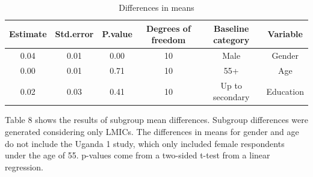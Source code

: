 \documentclass[
  12pt,
]{article}
\begin{document}
\begin{table}[!h]

\caption{\label{tab:dmeans}Differences in means}
\centering
\fontsize{10}{12}\selectfont
\begin{threeparttable}
\begin{tabular}[t]{cccccc}
\toprule
\textbf{Estimate} & \textbf{Std.error} & \textbf{P.value} & \textbf{Degrees of freedom} & \textbf{Baseline category} & \textbf{Variable}\\
\midrule
0.04 & 0.01 & 0.00 & 10 & Male & Gender\\
0.00 & 0.01 & 0.71 & 10 & 55+ & Age\\
0.02 & 0.03 & 0.41 & 10 & Up to secondary & Education\\
\bottomrule
\end{tabular}
\begin{tablenotes}
\item Table 8 shows the results of subgroup mean differences. Subgroup differences were generated considering only LMICs. The differences in means for gender and age do not include the Uganda 1 study, which only included female respondents under the age of 55. p-values come from a two-sided t-test from a linear regression.
\end{tablenotes}
\end{threeparttable}
\end{table}

\clearpage
\end{document}
